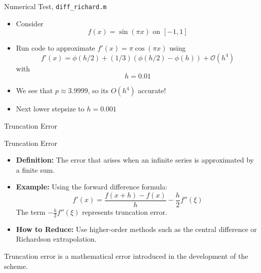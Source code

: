 \documentclass[10pt]{beamer}
\begin{document}
\begin{frame}{Numerical Test, \texttt{diff\_richard.m}}
\begin{itemize}
    \item Consider
    \begin{equation*}
      f(x) = \sin(\pi x)\,\, \text{on}\,\, [-1,1]
    \end{equation*}
    \item Run code to approximate $f'(x) = \pi \cos(\pi x)$ using
    \begin{equation*}
      f'(x) = \phi(h/2) + (1/3) (\phi(h/2) - \phi(h)) + \mathcal{O}(h^4)
    \end{equation*}
    with
    $$h=0.01$$
    \bigskip
    
    \item<2-> We see that $p\approx 3.9999$, so its $O(h^4)$ accurate!
    
    \item<3-> Next lower stepsize to $h=0.001$ 
\end{itemize}
\end{frame}

\begin{frame}{Truncation Error}

\begin{block}{Truncation Error}
\begin{itemize}
    \item \textbf{Definition:} The error that arises when an infinite series is approximated by a finite sum.

\item \textbf{Example:} Using the forward difference formula:
\begin{equation*}
    f'(x) = \frac{f(x+h) - f(x)}{h} - \frac{h}{2} f''(\xi)
\end{equation*}
The term $- \frac{h}{2} f''(\xi)$ represents truncation error.

\item \textbf{How to Reduce:} Use higher-order methods such as the central difference or Richardson extrapolation.
\end{itemize}
\end{block}
\begin{center}
    Truncation error is a mathematical error introduced in the development of the scheme.
\end{center}

\end{frame}
\end{document}
